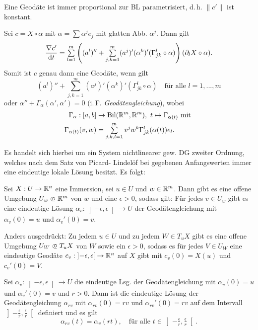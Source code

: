 \documentclass{cheat-sheet}
\newcommand{\Bil}{\mathrm{Bil}}
\newcommand{\ointervall}[1]{\left]#1\right[} %
\let\mySum\sum
\DeclareMathOperator*{\textsum}{{\textstyle \mySum}}
\renewcommand{\sum}{\textsum\limits}
\newcommand\opn{\mathrel{\ooalign{$\subset$\cr
  \hidewidth\raise.1ex\hbox{$\circ\mkern.5mu$}\cr}}}
\begin{document}
\begin{satz}
  Eine Geodäte ist immer proportional zur BL parametrisiert, d.\,h. $\|c'\|$ ist konstant.
\end{satz}

\begin{bem}
  Sei $c = X \circ \alpha$ mit $\alpha = \sum \alpha^j e_j$ mit glatten Abb. $\alpha^j$. Dann gilt
  \[ \frac{\nabla c'}{\d t} = \sum_{l=1}^m \left( (a^l)'' + \sum_{j,k=1}^m (a^j)' (\alpha^k)' (\Gamma_{jk}^l \circ \alpha) \right) (\partial_l X \circ \alpha). \]
  Somit ist $c$ genau dann eine Geodäte, wenn gilt
  \[ (a^l)'' + \sum_{j,k=1}^m (a^j)' (\alpha^k)' (\Gamma_{jk}^l \circ \alpha) \quad \text{für alle $l = 1, ..., m$} \]
  oder $\alpha'' + \Gamma_{\alpha}(\alpha', \alpha') = 0$ (i.\,F. \emph{Geodätengleichung}), wobei
  \begin{align*}
    \Gamma_{\alpha} : [a, b] &\to \Bil(\R^m, \R^m), \  t \mapsto \Gamma_{\alpha(t)} \text{ mit }\\
    \Gamma_{\alpha(t)}(v, w) &= \sum_{j,k,l=1}^m v^j w^k \Gamma_{jk}^l (\alpha(t)) e_l.
  \end{align*}
\end{bem}

\begin{bem}
  Es handelt sich hierbei um ein System nichtlinearer gew. DG zweiter Ordnung, welches nach dem Satz von Picard- Lindelöf bei gegebenen Anfangswerten immer eine eindeutige lokale Lösung besitzt. Es folgt:
\end{bem}

\begin{satz}
  Sei $X : U \to \mathbb{R}^n$ eine Immersion, sei $u \in U$ und $w \in \mathbb{R}^m$. Dann gibt es eine offene Umgebung $U_w \opn \R^m$ von $w$ und eine $\epsilon > 0$, sodass gilt: Für jedes $v \in U_w$ gibt es eine eindeutige Lösung $\alpha_v : \ointervall{-\epsilon, \epsilon} \to U$ der Geodätengleichung mit $\alpha_v(0) = u$ und $\alpha_v'(0) = v$.

  Anders ausgedrückt: Zu jedem $u \in U$ und zu jedem $W \in T_u X$ gibt es eine offene Umgebung $U_W \opn T_u X$ von $W$ sowie ein $\epsilon > 0$, sodass es für jedes $V \in U_W$ eine eindeutige Geodäte $c_v : \ointervall{-\epsilon, \epsilon} \to \R^n$ auf $X$ gibt mit $c_v(0) = X(u)$ und $c_v'(0) = V$.
\end{satz}

\begin{satz}
  Sei $\alpha_v : \ointervall{-\epsilon, \epsilon} \to U$ die eindeutige Lsg. der Geodätengleichung mit $\alpha_v(0) = u$ und $\alpha_v'(0) = v$ und $r > 0$. Dann ist die eindeutige Lösung der Geodätengleichung $\alpha_{rv}$ mit $\alpha_{rv}(0) = rv$ und $\alpha_{rv}'(0) = rv$ auf dem Intervall $\ointervall{-\tfrac{\epsilon}{r}, \tfrac{\epsilon}{r}}$ definiert und es gilt
  \[ \alpha_{rv}(t) = \alpha_v(rt), \quad \text{für alle } t \in \ointervall{-\tfrac{\epsilon}{r}, \tfrac{\epsilon}{r}}. \]
\end{satz}
\end{document}
